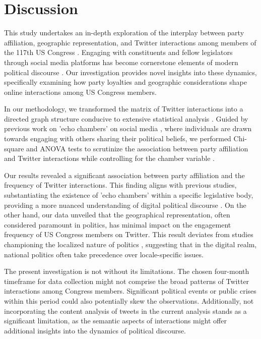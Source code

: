 \documentclass[11pt]{article}
\begin{document}
\section*{Discussion}

This study undertakes an in-depth exploration of the interplay between party affiliation, geographic representation, and Twitter interactions among members of the 117th US Congress \cite{Hua2020CharacterizingTU, Stier2018ElectionCO}. Engaging with constituents and fellow legislators through social media platforms has become cornerstone elements of modern political discourse \cite{Muragod2018TheSM}. Our investigation provides novel insights into these dynamics, specifically examining how party loyalties and geographic considerations shape online interactions among US Congress members.

In our methodology, we transformed the matrix of Twitter interactions into a directed graph structure conducive to extensive statistical analysis \cite{McCreadie2013ScalableDE}. Guided by previous work on 'echo chambers' on social media \cite{Garimella2018PoliticalDO, Luceri2019RedBD}, where individuals are drawn towards engaging with others sharing their political beliefs, we performed Chi-square and ANOVA tests to scrutinize the association between party affiliation and Twitter interactions while controlling for the chamber variable \cite{Farine2015ConstructingCA, Gmez2008StatisticalAO}. 

Our results revealed a significant association between party affiliation and the frequency of Twitter interactions. This finding aligns with previous studies, substantiating the existence of 'echo chambers' within a specific legislative body, providing a more nuanced understanding of digital political discourse \cite{Garimella2018PoliticalDO, Luceri2019RedBD}. On the other hand, our data unveiled that the geographical representation, often considered paramount in politics, has minimal impact on the engagement frequency of US Congress members on Twitter. This result deviates from studies championing the localized nature of politics \cite{Barber2016LessIM, Vliet2020TheTP}, suggesting that in the digital realm, national politics often take precedence over locale-specific issues. 

The present investigation is not without its limitations. The chosen four-month timeframe for data collection might not comprise the broad patterns of Twitter interactions among Congress members. Significant political events or public crises within this period could also potentially skew the observations. Additionally, not incorporating the content analysis of tweets in the current analysis stands as a significant limitation, as the semantic aspects of interactions might offer additional insights into the dynamics of political discourse.
\end{document}
